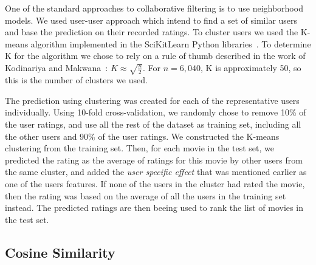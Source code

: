 One of the standard approaches to collaborative filtering is to use neighborhood models. We used user-user approach which intend to find a set of similar users and base the prediction on their recorded ratings. To cluster users we used the K-means algorithm implemented in the SciKitLearn Python libraries~\cite{pedregosa2011scikit}. To determine K for the algorithm we chose to rely on a rule of thumb described in the work of Kodinariya and Makwana~\cite{kodinariya2013review}: $K\approx\sqrt{\frac{n}{2}}$. For $n=6,040$, K is approximately 50, so this is the number of clusters we used.

The prediction using clustering was created for each of the representative users individually. Using 10-fold cross-validation, we randomly chose to remove 10\% of the user ratings, and use all the rest of the dataset as training set, including all the other users and 90\% of the user ratings. We constructed the K-means clustering from the training set. Then, for each movie in the test set, we predicted the rating as the average of ratings for this movie by other users from the same cluster, and added the \textit{user specific effect} that was mentioned earlier as one of the users features. If none of the users in the cluster had rated the movie, then the rating was based on the average of all the users in the training set instead. The predicted ratings are then beeing used to rank the list of movies in the test set.

\subsection{Cosine Similarity}


